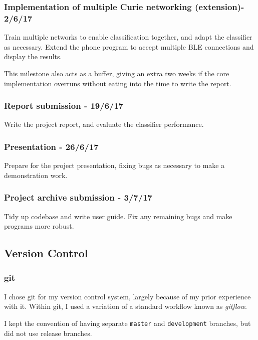 \documentclass[a4paper]{article}
\begin{document}
\subsubsection{Implementation of multiple Curie networking (extension)- 2/6/17}

Train multiple networks to enable classification together, and adapt the classifier as necessary.
Extend the phone program to accept multiple BLE connections and display the results.

This milestone also acts as a buffer, giving an extra two weeks if the core implementation overruns without eating into the time to write the report.

\subsubsection{Report submission - 19/6/17}

Write the project report, and evaluate the classifier performance. 

\subsubsection{Presentation - 26/6/17}

Prepare for the project presentation, fixing bugs as necessary to make a demonstration work. 

\subsubsection{Project archive submission - 3/7/17}

Tidy up codebase and write user guide. Fix any remaining bugs and make programs more robust.

\subsection{Version Control}%
\label{subsec:pp_vc}

\subsubsection{git}

I chose git\cite{ppref0} for my version control system, largely because of my prior experience with it. Within git, I used a variation of a standard workflow known as \textit{gitflow}.\cite{ppref1} 

I kept the convention of having separate \lstinline{master} and \lstinline{development} branches, but did not use release branches. 
\end{document}
